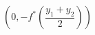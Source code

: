 \documentclass[preview]{standalone}
\begin{document}
\begin{center}
$(0, -f^*(\dfrac{y_1 + y_2}{2}))$
\end{center}
\end{document}

